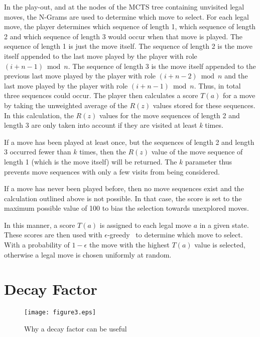 \documentclass[journal]{IEEEtran}
\begin{document}
In the play-out, and at the nodes of the MCTS tree containing unvisited legal moves, the N-Grams are used to determine which move to select. For each legal move, the player determines which sequence of length 1, which sequence of length 2 and which sequence of length 3 would occur when that move is played. The sequence of length 1 is just the move itself. The sequence of length 2 is the move itself appended to the last move played by the player with role $\left(i+n-1 \right) \bmod{n}$. The sequence of length 3 is the move itself appended to the previous last move played by the player with role  $\left(i+n-2 \right) \bmod{n}$ and the last move played by the player with role $\left(i+n-1 \right) \bmod{n}$.  Thus, in total three sequences could occur. The player then calculates a score $T(a)$ for a move by taking the unweighted average of the $R(z)$ values stored for these sequences. In this calculation, the $R(z)$ values for the move sequences of length 2 and length 3 are only taken into account if they are visited at least \textit{k} times. 


If a move has been played at least once, but the sequences of length 2 and length 3 occurred fewer than $k$ times, then the $R(z)$ value of the move sequence of length 1 (which is the move itself) will be returned.
The $k$ parameter thus prevents move sequences with only a few visits from being considered.

If a move has never been played before, then no move sequences exist and the calculation outlined above is not possible. In that case, the score is set to the maximum possible value of 100 to bias the selection towards unexplored moves.


In this manner, a score $T(a)$ is assigned to each legal move $a$ in a given state. These scores are then used with $\epsilon$-greedy~\cite{suttonBarto,Sturtevant2008} to determine which move to select. With a probability of $1-\epsilon$ the move with the highest $T(a)$ value is selected, otherwise a legal move is chosen uniformly at random.


\section{Decay Factor}
\label{sec:decay}

\begin{figure}[t!]
\centering
\texttt{[image: figure3.eps]}

\caption{Why a decay factor can be useful}
\label{fig:decayFigure}
\end{figure}
\end{document}
